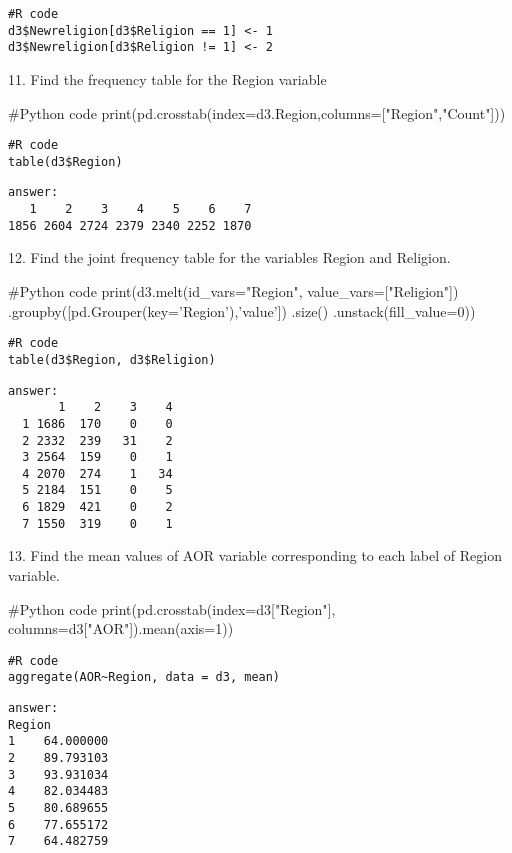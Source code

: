 \documentclass{article}
\begin{document}
\begin{verbatim}
#R code
d3$Newreligion[d3$Religion == 1] <- 1
d3$Newreligion[d3$Religion != 1] <- 2
\end{verbatim}


11. Find the frequency table for the Region variable
\begin{pythoncode}
#Python code
print(pd.crosstab(index=d3.Region,columns=["Region","Count"]))
\end{pythoncode}

\begin{verbatim}
#R code
table(d3$Region)

\end{verbatim}

\begin{verbatim}
answer: 
   1    2    3    4    5    6    7
1856 2604 2724 2379 2340 2252 1870
\end{verbatim}


12.	Find the joint frequency table for the variables Region and Religion.
\begin{pythoncode}
#Python code
print(d3.melt(id_vars="Region", value_vars=["Religion"])
         .groupby([pd.Grouper(key='Region'),'value'])
         .size()
         .unstack(fill_value=0))
\end{pythoncode}

\begin{verbatim}
#R code
table(d3$Region, d3$Religion)
\end{verbatim}

\begin{verbatim}
answer: 
       1    2    3    4
  1 1686  170    0    0
  2 2332  239   31    2
  3 2564  159    0    1
  4 2070  274    1   34
  5 2184  151    0    5
  6 1829  421    0    2
  7 1550  319    0    1
\end{verbatim}


13.	Find the mean values of AOR variable corresponding to each label of Region variable.
\begin{pythoncode}
#Python code
print(pd.crosstab(index=d3["Region"], columns=d3["AOR"]).mean(axis=1))
\end{pythoncode}

\begin{verbatim}
#R code
aggregate(AOR~Region, data = d3, mean)
\end{verbatim}

\begin{verbatim}
answer: 
Region
1    64.000000
2    89.793103
3    93.931034
4    82.034483
5    80.689655
6    77.655172
7    64.482759
\end{verbatim}
\end{document}
